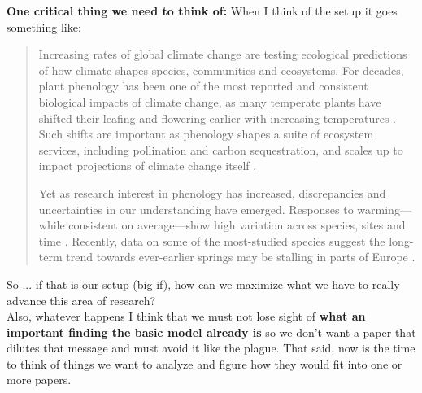 \documentclass[11pt,letterpaper]{article}
\begin{document}
{\bf One critical thing we need to think of:} When I think of the setup it goes something like:
\begin{quote}
Increasing rates of global climate change are testing ecological predictions of how climate shapes species, communities and ecosystems. For decades, plant phenology has been one of the most reported and consistent biological impacts of climate change, as many temperate plants have shifted their leafing and flowering earlier with increasing temperatures \citep{Wolkovich:2012n,IPCC:2014sm}. Such shifts are important as phenology shapes a suite of ecosystem services, including pollination and carbon sequestration, and scales up to impact projections of climate change itself \citep{Cleland:2007or}. 

Yet as research interest in phenology has increased, discrepancies and uncertainties in our understanding have emerged. Responses to warming---while consistent on average---show high variation across species, sites and time \citep{tansley}. Recently, data on some of the most-studied species suggest the long-term trend towards ever-earlier springs may be stalling in parts of Europe \citep{fu2015}. 
\end{quote}

So ... if that is our setup (big if), how can we maximize what we have to really advance this area of research?\\


Also, whatever happens I think that we must not lose sight of {\bf what an important finding the basic model already is} so we don't want a paper that dilutes that message and must avoid it like the plague. That said, now is the time to think of things we want to analyze and figure how they would fit into one or more papers. 


\end{document}
